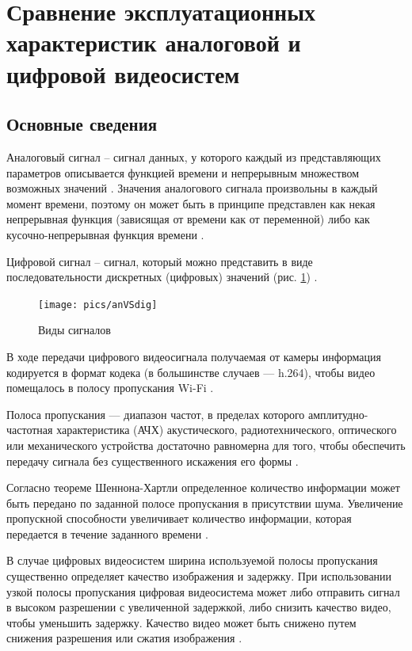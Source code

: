 
\section{Сравнение эксплуатационных характеристик аналоговой и цифровой видеосистем}

\subsection{Основные сведения}

Аналоговый сигнал -- сигнал данных, у которого каждый из представляющих параметров описывается функцией времени и непрерывным множеством возможных значений \cite{analogDes}.
Значения аналогового сигнала произвольны в каждый момент времени, поэтому он может быть в принципе представлен как некая непрерывная функция (зависящая от времени как от переменной) либо как кусочно-непрерывная функция времени \cite{analog}.

Цифровой сигнал -- сигнал, который можно представить в виде последовательности дискретных (цифровых) значений (рис. \ref{fig:anVSdig}) \cite{digital}.

\begin{figure}[H]
	\centering
	\texttt{[image: pics/anVSdig]}
	\caption{ Виды сигналов 
	}
	\label{fig:anVSdig}
\end{figure}

В ходе передачи цифрового видеосигнала получаемая от камеры информация кодируется в формат кодека (в большинстве случаев — h.264), чтобы видео помещалось в полосу пропускания Wi-Fi \cite{kodec}. 

Полоса пропускания — диапазон частот, в пределах которого амплитудно-частотная характеристика (АЧХ) акустического, радиотехнического, оптического или механического устройства достаточно равномерна для того, чтобы обеспечить передачу сигнала без существенного искажения его формы \cite{propusk}.

Согласно теореме Шеннона-Хартли определенное количество информации может быть передано по заданной полосе пропускания в присутствии шума. Увеличение пропускной способности увеличивает количество информации, которая передается в течение заданного времени \cite{shenon}.

В случае цифровых видеосистем ширина используемой полосы пропускания существенно определяет качество изображения и задержку. При использовании узкой полосы пропускания цифровая видеосистема может либо отправить сигнал в высоком разрешении с увеличенной задержкой, либо снизить качество видео, чтобы уменьшить задержку. Качество видео может быть снижено путем снижения разрешения или сжатия изображения \cite{profpv}.

